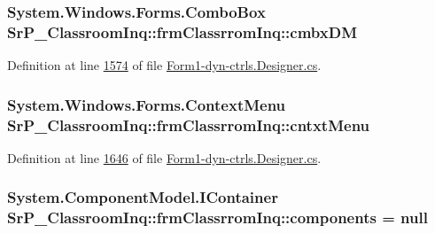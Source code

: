 \hypertarget{class_sr_p___classroom_inq_1_1frm_classrrom_inq_a3d1c3cd1ef0f02e6e927a4fd741672e5}{
\subsubsection[{cmbx\-D\-M}]{\setlength{\rightskip}{0pt plus 5cm}\-System.\-Windows.\-Forms.\-Combo\-Box {\bf \-Sr\-P\-\_\-\-Classroom\-Inq\-::frm\-Classrrom\-Inq\-::cmbx\-D\-M}}}
\label{class_sr_p___classroom_inq_1_1frm_classrrom_inq_a3d1c3cd1ef0f02e6e927a4fd741672e5}


\-Definition at line \hyperlink{_form1-dyn-ctrls_8_designer_8cs_source_l01574}{1574} of file \hyperlink{_form1-dyn-ctrls_8_designer_8cs_source}{\-Form1-\/dyn-\/ctrls.\-Designer.\-cs}.

\hypertarget{class_sr_p___classroom_inq_1_1frm_classrrom_inq_a7fb167457515aba637054c47a301188e}{
\subsubsection[{cntxt\-Menu}]{\setlength{\rightskip}{0pt plus 5cm}\-System.\-Windows.\-Forms.\-Context\-Menu {\bf \-Sr\-P\-\_\-\-Classroom\-Inq\-::frm\-Classrrom\-Inq\-::cntxt\-Menu}}}
\label{class_sr_p___classroom_inq_1_1frm_classrrom_inq_a7fb167457515aba637054c47a301188e}


\-Definition at line \hyperlink{_form1-dyn-ctrls_8_designer_8cs_source_l01646}{1646} of file \hyperlink{_form1-dyn-ctrls_8_designer_8cs_source}{\-Form1-\/dyn-\/ctrls.\-Designer.\-cs}.

\hypertarget{class_sr_p___classroom_inq_1_1frm_classrrom_inq_a9ae295b3d0621cd5e50bcf8a475c0686}{
\subsubsection[{components}]{\setlength{\rightskip}{0pt plus 5cm}\-System.\-Component\-Model.\-I\-Container {\bf \-Sr\-P\-\_\-\-Classroom\-Inq\-::frm\-Classrrom\-Inq\-::components} = null}}
\label{class_sr_p___classroom_inq_1_1frm_classrrom_inq_a9ae295b3d0621cd5e50bcf8a475c0686}


